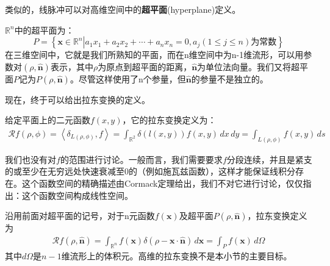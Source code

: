 \documentclass{ctexbook}
\begin{document}
类似的，线脉冲可以对高维空间中的\textbf{超平面}(hyperplane)定义。
\begin{definition}
$\mathbb{R}^n$中的超平面为：
\[P=\left\{\mathbf{x}\in\mathbb{R}^n\left|a_1 x_1+a_2 x_2+\cdots+a_n x_n=0,a_j(1\leq j\leq n)\text{为常数}\right.\right\}\]
在三维空间中，它就是我们所熟知的平面，而在n维空间中为n-1维流形，可以用参数对$(\rho,\hat{\mathbf{n}})$表示，其中$\rho$为原点到超平面的距离，$\hat{\mathbf{n}}$为单位法向量。我们又将超平面$P$记为$P(\rho,\hat{\mathbf{n}})$。尽管这样使用了n个参量，但$\hat{\mathbf{n}}$的参量不是独立的。
\end{definition}

现在，终于可以给出拉东变换的定义。
\begin{definition}[拉东变换]
    给定平面上的二元函数$f(x,y)$，它的拉东变换定义为：
    \begin{align*}
    \mathcal{R} f(\rho,\phi)=\left\langle \delta_{L(\rho,\phi)},f\right\rangle=\int_{\mathbb{R}^2}\delta(l(x,y))f(x,y)\,dx\,dy=\int_{L(\rho,\phi)}f(x,y)\,ds
    \end{align*}
\end{definition}
\begin{remark}
    我们也没有对$f$的范围进行讨论。一般而言，我们需要要求$f$分段连续，并且是紧支的或至少在无穷远处快速衰减至0的（例如施瓦兹函数），这样才能保证线积分存在。这个函数空间的精确描述由Cormack定理给出，我们不对它进行讨论，仅仅指出：这个函数空间构成线性空间。
\end{remark}
\begin{remark}
    沿用前面对超平面的记号，对于n元函数$f(\mathbf{x})$及超平面$P(\rho,\hat{\mathbf{n}})$，拉东变换定义为
    \begin{align*}
    \mathcal{R} f(\rho,\hat{\mathbf{n}})=\int_{\mathbb{R}^n}f(\mathbf{x})\delta(\rho-\mathbf{x}\cdot\hat{\mathbf{n}})\,d\mathbf{x}=\int_{P}f(\mathbf{x})\,d\Omega
    \end{align*}
    其中$d\Omega$是$n-1$维流形上的体积元。高维的拉东变换不是本小节的主要目标。
\end{remark}
\end{document}
